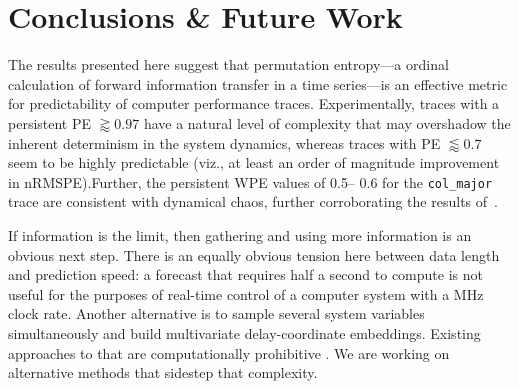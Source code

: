 \documentclass{article}
\begin{document}












\section{ Conclusions \& Future Work}\label{sec:conc}

The results presented here suggest that permutation entropy---a ordinal
calculation of forward information transfer in a time series---is an effective
metric for predictability of computer performance traces. Experimentally, traces
with a persistent PE $\gtrapprox 0.97$ have a natural level of complexity that
may overshadow the inherent determinism in the system dynamics, whereas traces
with PE $\lessapprox 0.7$ seem to be highly predictable (viz., at least an order
of magnitude improvement in nRMSPE).Further, the persistent WPE values of 0.5--
0.6 for the {\tt col\_major} trace are consistent with dynamical chaos, further
corroborating the results of~\cite{mytkowicz09}.

If information is the limit, then gathering and using more information is an
obvious next step.  There is an equally obvious tension here between data length
and prediction speed: a forecast that requires half a second to compute is not
useful for the purposes of real-time control of a computer system with a MHz
clock rate.  Another alternative is to sample several system variables
simultaneously and build multivariate delay-coordinate embeddings.  Existing
approaches to that are computationally prohibitive
\cite{cao-multivariate-embedding}.  We are working on alternative
methods that sidestep that complexity.
\end{document}
